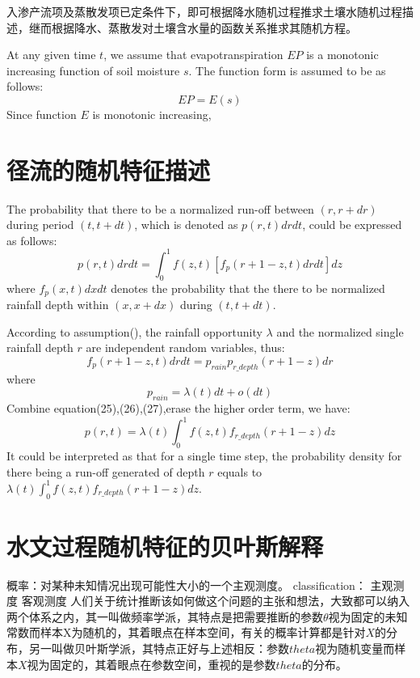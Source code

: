 入渗产流项及蒸散发项已定条件下，即可根据降水随机过程推求土壤水随机过程描述，继而根据降水、蒸散发对土壤含水量的函数关系推求其随机方程。

\iffalse
At any given time $t$, we assume that evapotranspiration $EP$ is a monotonic increasing function of soil moisture $s$. The function form is assumed to be as follows:
\begin{equation}
EP=E(s)
\end{equation}
Since function $E$ is monotonic increasing, 
\section{径流的随机特征描述}
The probability that there to be a normalized run-off between $(r,r+dr)$ during period $(t,t+dt)$, which is denoted as $p(r,t)drdt$, could be expressed as follows:
 \begin{equation}
 p(r,t)drdt=\int_{0}^{1} f(z,t)[f_p(r+1-z,t)drdt]dz
 \end{equation}
where $f_p(x,t)dxdt$ denotes the probability that the there to be normalized rainfall depth within $(x, x+dx)$ during $(t, t+dt)$. 

According to assumption(), the rainfall opportunity $\lambda$ and the normalized single rainfall depth $r$ are independent random variables, thus:
\begin{equation}
f_p(r+1-z,t)drdt=p_{rain}p_{r\_depth}(r+1-z)dr
\end{equation}
where
\begin{equation}
p_{rain}=\lambda(t)dt+o(dt)
\end{equation}
Combine equation(25),(26),(27),erase the higher order term, we have:
 \begin{equation}
 p(r,t)=\lambda(t)\int_{0}^{1} f(z,t)f_{r\_depth}(r+1-z)dz
 \end{equation} 
It could be interpreted as that for a single time step, the probability density for there being a run-off generated of depth $r$ equals to $\lambda(t)\int_{0}^{1} f(z,t)f_{r\_depth}(r+1-z)dz$.
 
\section{水文过程随机特征的贝叶斯解释}
概率：对某种未知情况出现可能性大小的一个主观测度。
classification： 主观测度 客观测度
人们关于统计推断该如何做这个问题的主张和想法，大致都可以纳入两个体系之内，其一叫做频率学派，其特点是把需要推断的参数$\theta$视为固定的未知常数而样本X为随机的，其着眼点在样本空间，有关的概率计算都是针对$X$的分布，另一叫做贝叶斯学派，其特点正好与上述相反：参数$theta$视为随机变量而样本$X$视为固定的，其着眼点在参数空间，重视的是参数$theta$的分布。

